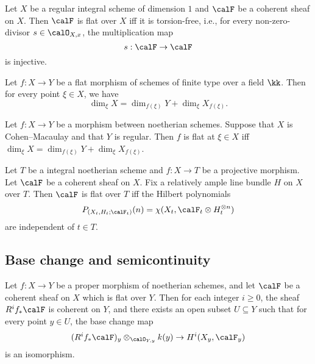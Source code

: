     \begin{proposition}\label{prop:flat_over_curve_iff_torsion_free}
        Let \(X\) be a regular integral scheme of dimension \(1\) and \(\calF\) be a coherent sheaf on \(X\).
        Then \(\calF\) is flat over \(X\) iff it is torsion-free, i.e., for every non-zero-divisor \(s \in \calO_{X,x}\), the multiplication map
        \[
            s:\calF\to\calF
        \]
        is injective.
    \end{proposition}

    \begin{proposition}\label{prop:flat_and_equi_dimensional_fiber}
        Let \(f:X \to Y\) be a flat morphism of schemes of finite type over a field \(\kk\).
        Then for every point \(\xi \in X\), we have
        \[ \dim_\xi X = \dim_{f(\xi)} Y + \dim_\xi X_{f(\xi)}. \]
    \end{proposition}

    \begin{theorem}\label{thm:Miracle_flatness}
        Let \(f:X\to Y\) be a morphism between noetherian schemes.
        Suppose that \(X\) is Cohen--Macaulay and that \(Y\) is regular.
        Then \(f\) is flat at \(\xi \in X\) iff \(\dim_\xi X = \dim_{f(\xi)} Y + \dim_\xi X_{f(\xi)}\).
    \end{theorem}

    \begin{theorem}\label{thm:flat_iff_has_the_same_Hilbert_polynomials}
        Let \(T\) be a integral noetherian scheme and \(f:X\to T\) be a projective morphism.
        Let \(\calF\) be a coherent sheaf on \(X\).
        Fix a relatively ample line bundle \(H\) on \(X\) over \(T\).
        Then \(\calF\) is flat over \(T\) iff the Hilbert polynomials 
        \[
            P_{(X_t,H_t;\calF_t)}(n) = \chi(X_t,\calF_t \otimes H_t^{\otimes n})
        \]
        are independent of \(t \in T\).
    \end{theorem}



\subsection{Base change and semicontinuity}

    \begin{theorem}\label{thm:Grauert_theorem}
        Let \(f:X\to Y\) be a proper morphism of noetherian schemes, and let \(\calF\) be a coherent sheaf on \(X\) which is flat over \(Y\).
        Then for each integer \(i\geq 0\), the sheaf \(R^i f_* \calF\) is coherent on \(Y\), and there exists an open subset \(U \subseteq Y\) such that for every point \(y \in U\), the base change map
        \[
            (R^i f_* \calF)_y \otimes_{\calO_{Y,y}} k(y) \to H^i(X_y,\calF_y)
        \]
        is an isomorphism.
    \end{theorem}

